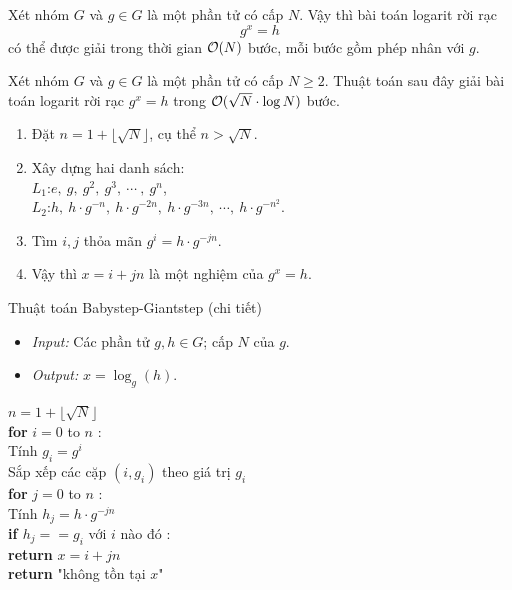 \begin{frame}
	\begin{prpstn} Xét nhóm $G$ và $g\in G$ là một phần tử có cấp $N$. Vậy thì bài toán logarit rời rạc 
		$$
		g^x = h
		$$
		có thể được giải trong thời gian $\mathcal{O}(N)$ bước, mỗi bước gồm phép nhân với $g$.
	\end{prpstn}
\end{frame}



\begin{frame}
	\begin{prpstn}
		Xét nhóm $G$ và $g \in G$ là một phần tử có cấp $N \geq 2$. Thuật toán sau đây giải bài toán logarit rời rạc $g^x = h$ trong $\mathcal{O}(\sqrt{N}\cdot \log N)$ bước.
		\begin{enumerate}
			\item<+-> Đặt $n = 1 + \lfloor \sqrt{N}\rfloor$, cụ thể $n > \sqrt{N}$.
			\item<+-> Xây dựng hai danh sách:\\
			$L_1$:\qquad  $e,\ g,\ g^2,\ g^3,\ \cdots\ ,\  g^n$,\\
			$L_2$:\qquad  $h,\ h\cdot g^{-n},\  h\cdot g^{-2n},\ h\cdot g^{-3n},\ \cdots,\ h\cdot g^{-n^2}$.
			\item<+-> Tìm $i,j$ thỏa mãn $g^i = h\cdot g^{-jn}$.
			\item<+-> Vậy thì $x = i + jn$ là một nghiệm của $g^x =h$.  
		\end{enumerate}
	\end{prpstn}
\end{frame}

\begin{frame}[t]{Thuật toán Babystep-Giantstep (chi tiết)}
\begin{itemize}
	\item \emph{Input:} Các phần tử $g,h \in G$; cấp $N$ của $g$.
	\item \emph{Output: } $x = \log_g(h)$. 
\end{itemize}	
\begin{block}{}
\qquad $n = 1+\lfloor \sqrt{N}\rfloor$\\
\qquad \textbf{for } $i = 0$ to $n$ :\\
\qquad \qquad Tính $g_i = g^{i}$\\
\qquad Sắp xếp các cặp $(i,g_i)$ theo giá trị $g_i$\\
\qquad \textbf{for } $j = 0$ to $n$ :\\
\qquad \qquad Tính $h_j = h\cdot g^{-jn}$\\
\qquad \qquad \textbf{if $h_j==g_i$} với $i$ nào đó : \\
\qquad \qquad \qquad  \textbf{return} $x = i +jn$\\
\qquad \textbf{return} "không tồn tại $x$"	
\end{block}
\end{frame}

